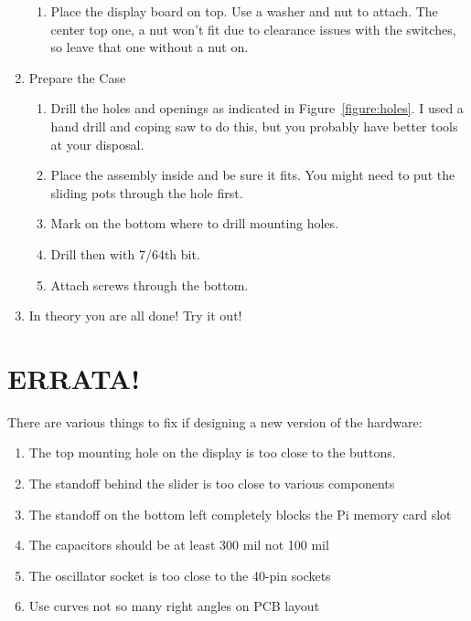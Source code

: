 \documentclass[11pt]{article}
\begin{document}
\begin{enumerate}
\begin{enumerate}
		\item Place the display board on top.
			Use a washer and nut to attach.
			The center top one, a nut won't fit due to clearance issues with
			the switches, so leave that one without a nut on.

		\end{enumerate}

	\item Prepare the Case
		\begin{enumerate}
		\item	Drill the holes and openings as indicated in
			Figure~\ref{figure:holes}.
			I used a hand drill and coping saw to do this, but you
			probably have better tools at your disposal.
		\item Place the assembly inside and be sure it fits.
			You might need to put the sliding pots through the hole first.
		\item Mark on the bottom where to drill mounting holes.
		\item Drill then with 7/64th bit.
		\item Attach screws through the bottom.
		\end{enumerate}

	\item In theory you are all done!  Try it out!

\end{enumerate}


\section{ERRATA!}

There are various things to fix if designing a new version of the
hardware:
\begin{enumerate}
\item The top mounting hole on the display is too close to the buttons.
\item The standoff behind the slider is too close to various components
\item The standoff on the bottom left completely blocks the Pi
	memory card slot
\item The capacitors should be at least 300 mil not 100 mil
\item The oscillator socket is too close to the 40-pin sockets
\item Use curves not so many right angles on PCB layout
\end{enumerate}




\end{document}
